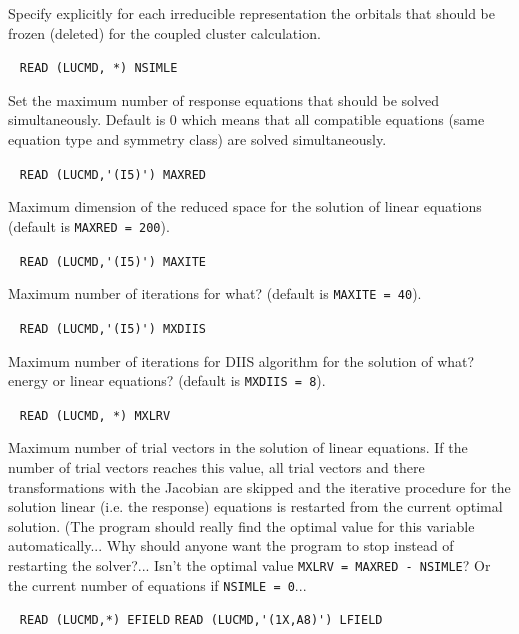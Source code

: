 \begin{description}
    Specify explicitly for each irreducible representation the
    orbitals that should be frozen (deleted) for the coupled cluster
    calculation.
 
\item[\Key{NSIMLE}] \verb| |\newline
  \verb|READ (LUCMD, *) NSIMLE|

  Set the maximum number of response equations that should be 
  solved simultaneously. Default is 0 which means that all
  compatible equations (same equation type and symmetry class) 
  are solved simultaneously.
 
\item[\Key{MAXRED}] \verb| |\newline 
  \verb|READ (LUCMD,'(I5)') MAXRED|

  Maximum dimension of the reduced space for the 
  solution of linear equations (default is \verb+MAXRED = 200+).
 
\item[\Key{MAXITE}] \verb| |\newline
  \verb|READ (LUCMD,'(I5)') MAXITE|

  Maximum number of iterations for what?
  (default is \verb+MAXITE = 40+).
 
\item[\Key{MXDIIS}] \verb| |\newline
  \verb|READ (LUCMD,'(I5)') MXDIIS|

  Maximum number of iterations for DIIS algorithm
  for the solution of what? energy or linear equations?
  (default is \verb+MXDIIS = 8+).
 
\item[\Key{MXLRV}] \verb| |\newline
  \verb|READ (LUCMD, *) MXLRV|

  Maximum number of trial vectors in the solution of 
  linear equations. If the number of trial vectors reaches this
  value, all trial vectors and there transformations with the
  Jacobian are skipped and the iterative procedure for the solution
  linear (i.e. the response) equations is restarted from the current 
  optimal solution. 
 (The program should really find the optimal value for
  this variable automatically... Why should anyone want the program
  to stop instead of restarting the solver?... Isn't the
  optimal value \verb+MXLRV = MAXRED - NSIMLE+? Or the current
  number of equations if \verb+NSIMLE = 0+...
 
\item[\Key{FIELD }] \verb| |\newline
    \verb|READ (LUCMD,*) EFIELD|\newline
    \verb|READ (LUCMD,'(1X,A8)') LFIELD|


\end{description}
